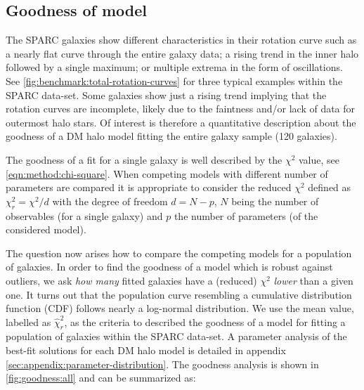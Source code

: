\subsection{Goodness of model}
\label{sec:result:gof}

The SPARC galaxies show different characteristics in their rotation curve such as a nearly flat curve through the entire galaxy data; a rising trend in the inner halo followed by a single maximum; or multiple extrema in the form of oscillations. See \cref{fig:benchmark:total-rotation-curves} for three typical examples within the SPARC data-set. Some galaxies show just a rising trend implying that the rotation curves are incomplete, likely due to the faintness and/or lack of data for outermost halo stars. Of interest is therefore a quantitative description about the goodness of a DM halo model fitting the entire galaxy sample (120 galaxies).

The goodness of a fit for a single galaxy is well described by the $\chi^2$ value, see \cref{eqn:method:chi-square}. When competing models with different number of parameters are compared it is appropriate to consider the reduced $\chi^2$ defined as $\chi_r^2 = \chi^2/d$ with the degree of freedom $d = N-p$, $N$ being the number of observables (for a single galaxy) and $p$ the number of parameters (of the considered model).

The question now arises how to compare the competing models for a population of galaxies. In order to find the goodness of a model which is robust against outliers, we ask \textit{how many} fitted galaxies have a (reduced) $\chi^2$ \textit{lower} than a given one. It turns out that the population curve resembling a cumulative distribution function (CDF) follows nearly a log-normal distribution. We use the mean value, labelled as $\hat \chi^2_r$, as the criteria to described the goodness of a model for fitting a population of galaxies within the SPARC data-set. A parameter analysis of the best-fit solutions for each DM halo model is detailed in appendix \ref{sec:appendix:parameter-distribution}. The goodness analysis is shown in \cref{fig:goodness:all} and can be summarized as:



